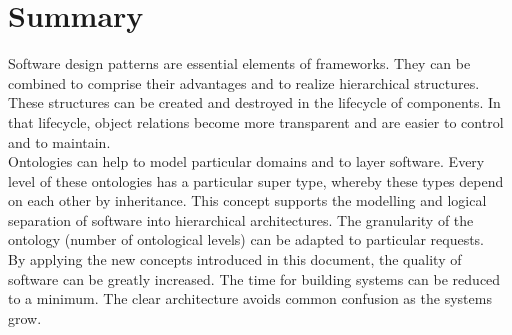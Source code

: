 \clearpage
\section{Summary}
Software design patterns are essential elements of frameworks. They can be
combined to comprise their advantages and to realize hierarchical structures.\\
These structures can be created and destroyed in the lifecycle of components.
In that lifecycle, object relations become more transparent and are easier
to control and to maintain.\\
Ontologies can help to model particular domains and to layer
software. Every level of these ontologies has a particular super
type, whereby these types depend on each other by inheritance.
This concept supports the modelling and logical separation of
software into hierarchical architectures. The granularity of the
ontology (number of ontological levels) can be adapted to
particular requests.
\\
By applying the new concepts introduced in this document, the quality of software
can be greatly increased. The time for building systems can be reduced to a minimum.
The clear architecture avoids common confusion as the systems grow.
